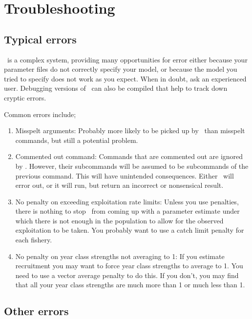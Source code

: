 \section{Troubleshooting\label{sec:trouble-shooting}}

\subsection{Typical errors\label{sec:typical-errors}}

\SPM\ is a complex system, providing many opportunities for error \textemdash either because your parameter files do not correctly specify your model, or because the model you tried to specify does not work as you expect. When in doubt, ask an experienced user. Debugging versions of \SPM\ can also be compiled that help to track down cryptic errors.

Common errors include;
\begin{enumerate}
\item Misspelt arguments: 
Probably more likely to be picked up by \SPM\ than misspelt commands, but still a potential problem. 

\item Commented out command: 
Commands that are commented out are ignored by \SPM. However, their subcommands will be assumed to be subcommands of the previous command. This will have unintended consequences. Either \SPM\ will error out, or it will run, but return an incorrect or nonsensical result. 

\item No penalty on exceeding exploitation rate limits: 
Unless you use penalties, there is nothing to stop \SPM\ from coming up with a parameter estimate under which there is not enough in the population to allow for the observed exploitation to be taken. You probably want to use a catch limit penalty for each fishery. 

\item No penalty on year class strengths not averaging to 1: 
If you estimate recruitment you may want to force year class strengths to average to 1. You need to use a vector average penalty to do this. If you don't, you may find that all your year class strengths are much more than 1 or much less than 1. 
\end{enumerate}

\subsection{Other errors}

